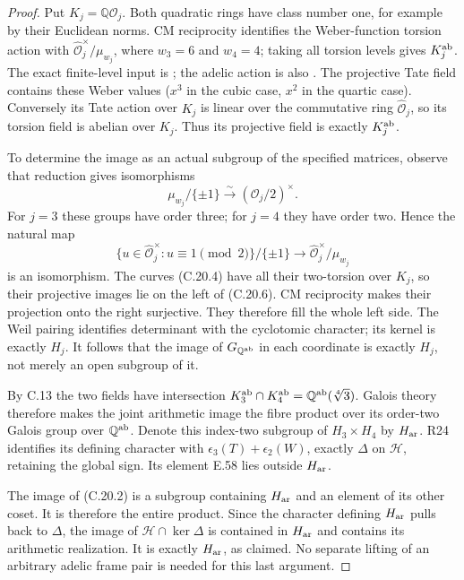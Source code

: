 \begin{proof}
Put $K_j=\mathbb Q\mathcal O_j$. Both quadratic
rings have class number one, for example by their
Euclidean norms. CM reciprocity identifies the
Weber-function torsion action with
$\widehat{\mathcal O}_j^{\times}/\mu_{w_j}$,
where $w_3=6$ and $w_4=4$; taking all torsion
levels gives $K_j^{\rm ab}$.
The exact finite-level input is
\cite[Corollaries 3.4 and 3.7]{PBC_LozanoRobledo2022};
the adelic action is also
\cite[Theorem 3.10]{PBC_MilneCM2007}.
The projective Tate field contains these Weber values
($x^3$ in the cubic case, $x^2$ in the quartic case).
Conversely its Tate action over $K_j$ is linear over
the commutative ring $\widehat{\mathcal O}_j$, so
its torsion field is abelian over $K_j$. Thus its
projective field is exactly $K_j^{\rm ab}$.

To determine the image as an actual subgroup of the
specified matrices, observe that reduction gives
isomorphisms
\[
       \mu_{w_j}/\{\pm1\}
                 \xrightarrow{\sim}(\mathcal O_j/2)^\times.
 \tag{C.20.5}
\]
For $j=3$ these groups have order three; for $j=4$
they have order two. Hence the natural map
\[
 \{u\in\widehat{\mathcal O}_j^\times:
               u\equiv1\pmod2\}/\{\pm1\}
       \longrightarrow
               \widehat{\mathcal O}_j^\times/\mu_{w_j}
 \tag{C.20.6}
\]
is an isomorphism. The curves (C.20.4) have all their
two-torsion over $K_j$, so their projective images
lie on the left of (C.20.6). CM reciprocity makes
their projection onto the right surjective.
They therefore fill the whole left side.
The Weil pairing identifies determinant with the
cyclotomic character; its kernel is exactly $H_j$.
It follows that the image of $G_{\mathbb Q^{\rm ab}}$
in each coordinate is exactly $H_j$, not merely an
open subgroup of it.

By C.13 the two fields have intersection
$K_3^{\rm ab}\cap K_4^{\rm ab}
=\mathbb Q^{\rm ab}(\sqrt[4]{3})$.
Galois theory therefore makes the joint arithmetic
image the fibre product over its order-two Galois
group over $\mathbb Q^{\rm ab}$. Denote this
index-two subgroup of $H_3\times H_4$ by $H_{\rm ar}$.
R24 identifies its defining character with
$\epsilon_3(T)+\epsilon_2(W)$, exactly $\Delta$
on $\mathcal H$, retaining the global sign. Its
element E.58 lies outside $H_{\rm ar}$.

The image of (C.20.2) is a subgroup containing
$H_{\rm ar}$ and an element of its other coset.
It is therefore the entire product. Since the
character defining $H_{\rm ar}$ pulls back to
$\Delta$, the image of $\mathcal H\cap\ker\Delta$
is contained in $H_{\rm ar}$ and contains its
arithmetic realization. It is exactly $H_{\rm ar}$,
as claimed. No separate lifting of an arbitrary
adelic frame pair is needed for this last argument.
\end{proof}

